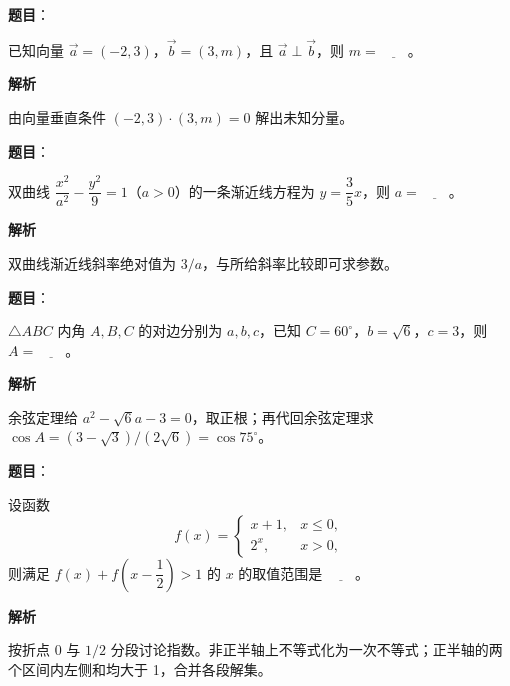 \begin{answer}

\textbf{题目}：

已知向量 \(\vec a=(-2,3)\)，\(\vec b=(3,m)\)，且 \(\vec a\perp\vec b\)，则 \(m=\underline{\qquad}\)。

\textbf{解析}

由向量垂直条件 \((-2,3)\cdot(3,m)=0\) 解出未知分量。


\end{answer}
\begin{answer}

\textbf{题目}：

双曲线 \(\dfrac{x^2}{a^2}-\dfrac{y^2}{9}=1\)（\(a>0\)）的一条渐近线方程为 \(y=\dfrac{3}{5}x\)，则 \(a=\underline{\qquad}\)。

\textbf{解析}

双曲线渐近线斜率绝对值为 \(3/a\)，与所给斜率比较即可求参数。


\end{answer}
\begin{answer}

\textbf{题目}：

\(\triangle ABC\) 内角 \(A,B,C\) 的对边分别为 \(a,b,c\)，已知 \(C=60^\circ\)，\(b=\sqrt{6}\)，\(c=3\)，则 \(A=\underline{\qquad}\)。

\textbf{解析}

余弦定理给 \(a^2-\sqrt6a-3=0\)，取正根；再代回余弦定理求 \(\cos A=(3-\sqrt3)/(2\sqrt6)=\cos75^\circ\)。


\end{answer}
\begin{answer}

\textbf{题目}：

设函数
\nopagebreak[4]
\[
f(x)=
\begin{cases}
x+1,&x\leq 0,\\
2^x,&x>0,
\end{cases}
\]
则满足 \(f(x)+f\left(x-\dfrac{1}{2}\right)>1\) 的 \(x\) 的取值范围是 \(\underline{\qquad}\)。

\textbf{解析}

按折点 \(0\) 与 \(1/2\) 分段讨论指数。非正半轴上不等式化为一次不等式；正半轴的两个区间内左侧和均大于 1，合并各段解集。


\end{answer}
